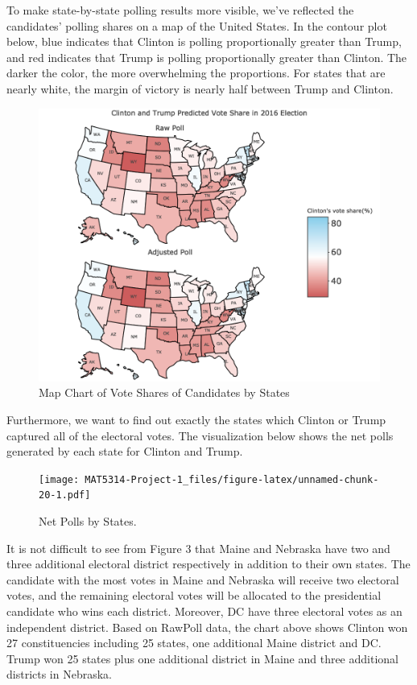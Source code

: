 \documentclass[
  12pt,
]{article}
\begin{document}
To make state-by-state polling results more visible, we've reflected the
candidates' polling shares on a map of the United States. In the contour
plot below, blue indicates that Clinton is polling proportionally
greater than Trump, and red indicates that Trump is polling
proportionally greater than Clinton. The darker the color, the more
overwhelming the proportions. For states that are nearly white, the
margin of victory is nearly half between Trump and Clinton.

\begin{figure}
\centering
\includegraphics{./Figures/mapchart_1_2.png}
\caption{Map Chart of Vote Shares of Candidates by States}
\end{figure}

Furthermore, we want to find out exactly the states which Clinton or
Trump captured all of the electoral votes. The visualization below shows
the net polls generated by each state for Clinton and Trump.

\begin{figure}
\centering
\texttt{[image: MAT5314-Project-1\_files/figure-latex/unnamed-chunk-20-1.pdf]}
\caption{Net Polls by States.}
\end{figure}

It is not difficult to see from Figure 3 that Maine and Nebraska have
two and three additional electoral district respectively in addition to
their own states. The candidate with the most votes in Maine and
Nebraska will receive two electoral votes, and the remaining electoral
votes will be allocated to the presidential candidate who wins each
district. Moreover, DC have three electoral votes as an independent
district. Based on RawPoll data, the chart above shows Clinton won 27
constituencies including 25 states, one additional Maine district and
DC. Trump won 25 states plus one additional district in Maine and three
additional districts in Nebraska.
\end{document}
